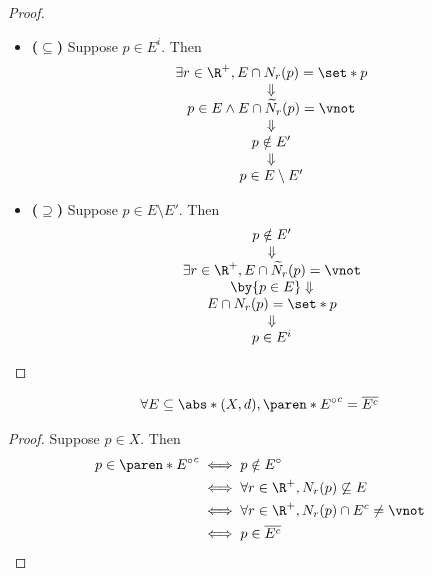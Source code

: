 \begin{proof}
  \leavevmode\par
  \begin{itemize}
    \item \textbf{($\subseteq$)} Suppose $p \in E^{i}$. Then
          \[
            \begin{array}{c}
              \exists r \in \R^{+}, E \cap N_{r}(p) = \set*{p}  \\
              \Downarrow                                        \\
              p \in E \land E \cap \widetilde{N}_{r}(p) = \vnot \\
              \Downarrow                                        \\
              p \notin E'                                       \\
              \Downarrow                                        \\
              p \in E \setminus E'
            \end{array}
          \]
    \item \textbf{($\supseteq$)} Suppose $p \in E \setminus E'$. Then
          \[
            \begin{array}{c}
              p \notin E'                                               \\
              \Downarrow                                                \\
              \exists r \in \R^{+}, E \cap \widetilde{N}_{r}(p) = \vnot \\
              \by{\ensuremath{p \in E}} \Downarrow                      \\
              E \cap N_{r}(p) = \set*{p}                                \\
              \Downarrow                                                \\
              p \in E^{i}
            \end{array}
          \]
  \end{itemize}
\end{proof}

\begin{lemma} \label{an1:lem:complement-of-interior-is-closure-of-complement}
  \[
    \forall E \subseteq \abs*{(X, d)}, \paren*{E^{\circ}}^{c} = \overline{E^{c}}
  \]
\end{lemma}

\begin{proof}
  Suppose $p \in X$. Then
  \begin{align*}
    p \in \paren*{E^{\circ}}^{c} & \iff p \notin E^{\circ}                                   \\
                                 & \iff \forall r \in \R^{+}, N_{r}(p) \not\subseteq E       \\
                                 & \iff \forall r \in \R^{+}, N_{r}(p) \cap E^{c} \neq \vnot \\
                                 & \iff p \in \overline{E^{c}}
  \end{align*}
\end{proof}

